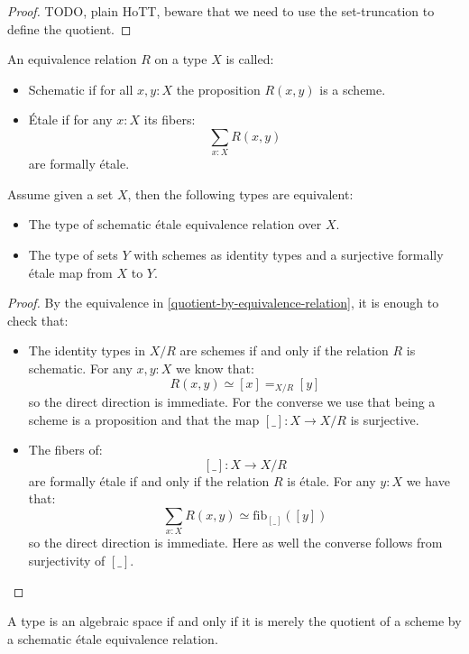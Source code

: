\begin{proof}
TODO, plain HoTT, beware that we need to use the set-truncation to define the quotient.
\end{proof}

\begin{definition}
An equivalence relation $R$ on a type $X$ is called:
\begin{itemize}
\item Schematic if for all $x,y:X$ the proposition $R(x,y)$ is a scheme.
\item Étale if for any $x:X$ its fibers:
\[\sum_{x:X} R(x,y)\]
are formally étale.
\end{itemize}
\end{definition}

\begin{proposition}\label{fundamental-propriety-algebraic-spaces}
Assume given a set $X$, then the following types are equivalent:
\begin{itemize}
\item The type of schematic étale equivalence relation over $X$.
\item The type of sets $Y$ with schemes as identity types and a surjective formally étale map from $X$ to $Y$.
\end{itemize}
\end{proposition}

\begin{proof}
By the equivalence in \cref{quotient-by-equivalence-relation}, it is enough to check that:
\begin{itemize}
\item The identity types in $X/R$ are schemes if and only if the relation $R$ is schematic. For any $x,y:X$ we know that:
\[R(x,y) \simeq [x] =_{X/R}[y]\]
so the direct direction is immediate. For the converse we use that being a scheme is a proposition and that the map $[\_]:X\to X/R$ is surjective.
\item The fibers of: 
\[[\_]:X\to X/R\] 
are formally étale if and only if the relation $R$ is étale. For any $y:X$ we have that:
\[\sum_{x:X} R(x,y) \simeq \mathrm{fib}_{[\_]}([y])\]
so the direct direction is immediate. Here as well the converse follows from surjectivity of $[\_]$.
\end{itemize}
\end{proof}

\begin{theorem}
A type is an algebraic space if and only if it is merely the quotient of a scheme by a schematic étale equivalence relation.
\end{theorem}

